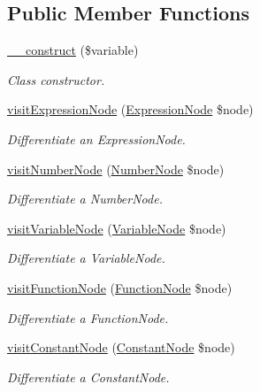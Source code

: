 \subsection*{Public Member Functions}
\begin{DoxyCompactItemize}
\item 
\hyperlink{classMathParser_1_1Interpreting_1_1Differentiator_aa0dd0abee57ec73eeaea9d3341e279f1}{\-\_\-\-\_\-construct} (\$variable)
\begin{DoxyCompactList}\small\item\em Class constructor. \end{DoxyCompactList}\item 
\hyperlink{classMathParser_1_1Interpreting_1_1Differentiator_afed6103538e71009c19d8dd0e37144ee}{visit\-Expression\-Node} (\hyperlink{classMathParser_1_1Parsing_1_1Nodes_1_1ExpressionNode}{Expression\-Node} \$node)
\begin{DoxyCompactList}\small\item\em Differentiate an Expression\-Node. \end{DoxyCompactList}\item 
\hyperlink{classMathParser_1_1Interpreting_1_1Differentiator_aa6fa0932e84b9f3d778387e48c96a9ef}{visit\-Number\-Node} (\hyperlink{classMathParser_1_1Parsing_1_1Nodes_1_1NumberNode}{Number\-Node} \$node)
\begin{DoxyCompactList}\small\item\em Differentiate a Number\-Node. \end{DoxyCompactList}\item 
\hyperlink{classMathParser_1_1Interpreting_1_1Differentiator_a52cc092817e78043da5e6bd86e09ff9f}{visit\-Variable\-Node} (\hyperlink{classMathParser_1_1Parsing_1_1Nodes_1_1VariableNode}{Variable\-Node} \$node)
\begin{DoxyCompactList}\small\item\em Differentiate a Variable\-Node. \end{DoxyCompactList}\item 
\hyperlink{classMathParser_1_1Interpreting_1_1Differentiator_a95027e99c32f63b0689005ff148bee3e}{visit\-Function\-Node} (\hyperlink{classMathParser_1_1Parsing_1_1Nodes_1_1FunctionNode}{Function\-Node} \$node)
\begin{DoxyCompactList}\small\item\em Differentiate a Function\-Node. \end{DoxyCompactList}\item 
\hyperlink{classMathParser_1_1Interpreting_1_1Differentiator_ab89f589a9e372a15997cc08608489e1f}{visit\-Constant\-Node} (\hyperlink{classMathParser_1_1Parsing_1_1Nodes_1_1ConstantNode}{Constant\-Node} \$node)
\begin{DoxyCompactList}\small\item\em Differentiate a Constant\-Node. \end{DoxyCompactList}\end{DoxyCompactItemize}
